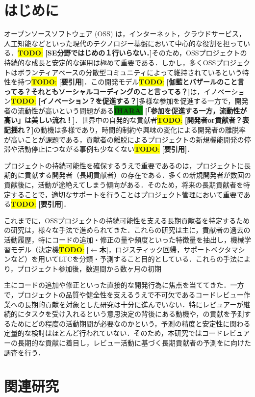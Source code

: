 \documentclass[submit,techrep,noauthor]{ipsj}
\newcommand{\todo}[1]{\colorbox{yellow}{{\bf TODO}:}{\color{red} {\textbf{[#1]}}}}
\newcommand{\ihara}[1]{\colorbox{green}{{\bf IHARA}:}{\color{blue} {\textbf{[#1]}}}}
\begin{document}
\section{はじめに}
オープンソースソフトウェア (OSS) は，インターネット，クラウドサービス，人工知能などといった現代のテクノロジー基盤において中心的な役割を担っている．\todo{SE分野ではじめの１行いらない．}そのため，OSSプロジェクトの持続的な成長と安定的な運用は極めて重要である．しかし，多くOSSプロジェクトはボランティアベースの分散型コミュニティによって維持されているという特性を持つ\todo{要引用}．この開発モデル\todo{伽藍とバザールのこと言ってる？それともソーシャルコーディングのこと言ってる？}は，イノベーション\todo{イノベーション？を促進する？}多様な参加を促進する一方で，開発者の流動性が高いという問題がある\ihara{「参加を促進する一方，流動性が高い」は美しい流れ！}．世界中の自発的な貢献者\todo{開発者or貢献者？表記揺れ？}の動機は多様であり，時間的制約や興味の変化による開発者の離脱率が高いことが課題である，貢献者の離脱によるプロジェクトの新規機能開発の停滞や活動停止につながる事例も少なくない\todo{要引用}．

プロジェクトの持続可能性を確保するうえで重要であるのは，プロジェクトに長期的に貢献する開発者（長期貢献者）の存在である．多くの新規開発者が数回の貢献後に，活動が途絶えてしまう傾向がある．そのため，将来の長期貢献者を特定することで，適切なサポートを行うことはプロジェクト管理において重要である\todo{要引用}．

これまでに，OSSプロジェクトの持続可能性を支える長期貢献者を特定するための研究は，様々な手法で進められてきた．これらの研究は主に，貢献者の過去の活動履歴，特にコードの追加・修正の量や頻度といった特徴量を抽出し，機械学習モデル（決定機\todo{$\leftarrow$木}，ロジスティック回帰，サポートベクタマシンなど）を用いてLTCを分類・予測すること目的としている．これらの手法により，プロジェクト参加後，数週間から数ヶ月の初期

主にコードの追加や修正といった直接的な開発行為に焦点を当ててきた．一方で，プロジェクトの品質や健全性を支えるうえで不可欠であるコードレビュー作業への長期的貢献を対象とした研究は十分に進んでいない．特にレビュアーが継続的にタスクを受け入れるという意思決定の背後にある動機や，の貢献を予測するためにどの程度の活動期間が必要なのかという，予測の精度と安定性に関わる定量的な検討はほとんど行われていない．そのため，本研究ではコードレビュアーの長期的な貢献に着目し，レビュー活動に基づく長期貢献者の予測をに向けた調査を行う．

\section{関連研究}
\label{sec:format}
\end{document}
